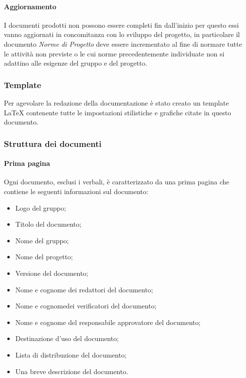 	\paragraph{Aggiornamento} \Spazio
	I documenti prodotti non possono essere completi fin dall'inizio per questo essi vanno aggiornati in concomitanza con lo sviluppo del progetto, in particolare il documento \textit{Norme di Progetto} deve essere incrementato al fine di normare tutte le attività non previste o le cui norme precedentemente individuate non si adattino alle esigenze del gruppo e del progetto.
		
	\subsubsection{Template}
	Per agevolare la redazione della documentazione è stato creato un template \LaTeX\text{ } contenente tutte le impostazioni stilistiche e grafiche citate in questo documento.
	
	\subsubsection{Struttura dei documenti}
	    \label{struttura}
		\paragraph{Prima pagina}\Spazio
		Ogni documento, esclusi i verbali, è caratterizzato da una prima pagina che contiene le seguenti informazioni sul documento:
		\begin{itemize}
			\item Logo del gruppo;
			\item Titolo del documento;
			\item Nome del gruppo;
			\item Nome del progetto;
			\item Versione del documento;
			\item Nome e cognome dei redattori del documento;
			\item Nome e cognomedei verificatori del documento;
			\item Nome e cognome del responsabile approvatore del documento;
			\item Destinazione d’uso del documento;
			\item Lista di distribuzione del documento;
			\item Una breve descrizione del documento.
		\end{itemize}
	
